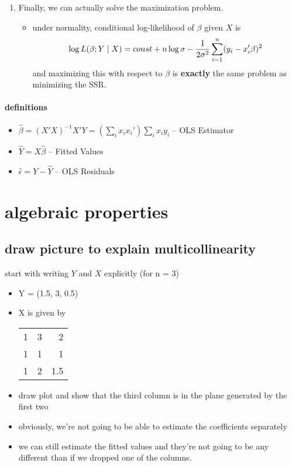 \begin{enumerate}
\begin{itemize}
\end{itemize}
\item Finally, we can actually solve the maximization problem.
\begin{itemize}
\item under normality, conditional log-likelihood of $\beta$ given
            $X$ is 
            \[ \log L(\beta; Y \mid X) = const + n \log \sigma - {1
            \over 2 \sigma^2} \sum_{i = 1}^n (y_i - x_i'\beta)^2 \]
            and maximizing this with respect to $\beta$ is \textbf{exactly} the
            same problem as minimizing the SSR.
\end{itemize}
\end{enumerate}

\paragraph{definitions}
\begin{itemize}
\item $\hat\beta = (X'X)^{-1}X'Y = \left(\sum_i x_i x_i'\right) \sum_i
        x_i y_i$ -- OLS Estimator
\item $\hat Y = X \hat \beta$ -- Fitted Values
\item $\hat \epsilon = Y - \hat Y$ -- OLS Residuals
\end{itemize}

\section{algebraic properties}
\subsection{draw picture to explain multicollinearity}

     start with writing $Y$ and $X$ explicitly (for n = 3)
\begin{itemize}
\item Y = (1.5, 3, 0.5)
\item X is given by

\begin{center}
\begin{tabular}{rrr}
 1  &  3  &    2  \\
 1  &  1  &    1  \\
 1  &  2  &  1.5  \\
\end{tabular}
\end{center}

\item draw plot and show that the third column is in the plane
       generated by the first two
\item obviously, we're not going to be able to estimate the
       coefficients separately
\item we can still estimate the fitted values and they're not going to
       be any different than if we dropped one of the columns.
\end{itemize}

